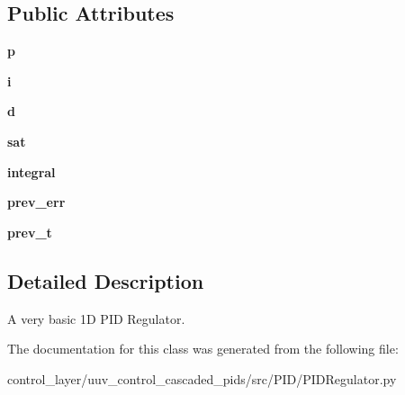 \subsection*{Public Attributes}
\begin{DoxyCompactItemize}
\item 
\mbox{\label{classPID_1_1PIDRegulator_1_1PIDRegulator_ae3b3ed4f0fbbd8ef3ce775608be8c64c}} 
{\bfseries p}
\item 
\mbox{\label{classPID_1_1PIDRegulator_1_1PIDRegulator_a88b051812a2f822dadd8cb6d076c6971}} 
{\bfseries i}
\item 
\mbox{\label{classPID_1_1PIDRegulator_1_1PIDRegulator_aa4167e0afee8abf759336ccee876ad07}} 
{\bfseries d}
\item 
\mbox{\label{classPID_1_1PIDRegulator_1_1PIDRegulator_a1cb71bbed5a6e242bbc5c929e1831649}} 
{\bfseries sat}
\item 
\mbox{\label{classPID_1_1PIDRegulator_1_1PIDRegulator_a30b6739527271cc1946dd285d88d02f4}} 
{\bfseries integral}
\item 
\mbox{\label{classPID_1_1PIDRegulator_1_1PIDRegulator_a84df376f2bf158640e3dd56ccd18be22}} 
{\bfseries prev\+\_\+err}
\item 
\mbox{\label{classPID_1_1PIDRegulator_1_1PIDRegulator_a1efa8a1d92942669963ddeee76688bea}} 
{\bfseries prev\+\_\+t}
\end{DoxyCompactItemize}


\subsection{Detailed Description}
\begin{DoxyVerb}A very basic 1D PID Regulator.\end{DoxyVerb}
 

The documentation for this class was generated from the following file\+:\begin{DoxyCompactItemize}
\item 
control\+\_\+layer/uuv\+\_\+control\+\_\+cascaded\+\_\+pids/src/\+P\+I\+D/P\+I\+D\+Regulator.\+py\end{DoxyCompactItemize}
